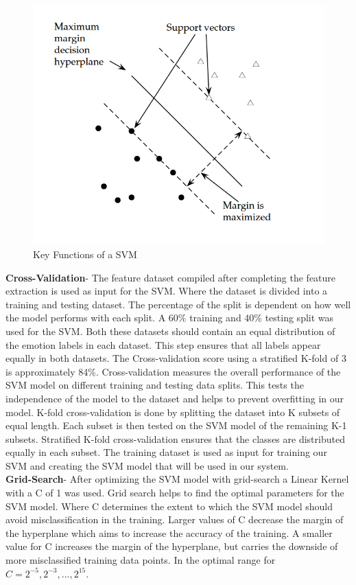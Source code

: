 \begin{itemize}
\begin{figure}[H]
  \centering
  \includegraphics[scale=0.6]{svm}
  \caption{Key Functions of a SVM \cite{stan}}
  \label{fig: svm}
\end{figure} 

\textbf{Cross-Validation}- The feature dataset compiled after completing the feature extraction is used as input for the SVM. Where the dataset is divided into a training and testing dataset. The percentage of the split is dependent on how well the model performs with each split. A 60\% training and 40\% testing split was used for the SVM. Both these datasets should contain an equal distribution of the emotion labels in each dataset. This step ensures that all labels appear equally in both datasets. The Cross-validation score using a stratified K-fold of 3 is approximately 84\%. \cite{svm}Cross-validation measures the overall performance of the SVM model on different training and testing data splits. This tests the independence of the model to the dataset and helps to prevent overfitting in our model. K-fold cross-validation is done by splitting the dataset into K subsets of equal length. Each subset is then tested on the SVM model of the remaining K-1 subsets. Stratified K-fold cross-validation ensures that the classes are distributed equally in each subset. The training dataset is used as input for training our SVM and creating the SVM model that will be used in our system.\\

\textbf{Grid-Search}- After optimizing the SVM model with grid-search a Linear Kernel with a C of 1 was used. \cite{svm}Grid search helps to find the optimal parameters for the SVM model. Where C determines the extent to which the SVM model should avoid misclassification in the training. Larger values of C decrease the margin of the hyperplane which aims to increase the accuracy of the training. A smaller value for C increases the margin of the hyperplane, but carries the downside of more misclassified training data points. In \cite{svm}the optimal range for $C = 2^{-5}, 2^{-3}, ..., 2^{15}$. 


\end{itemize}

